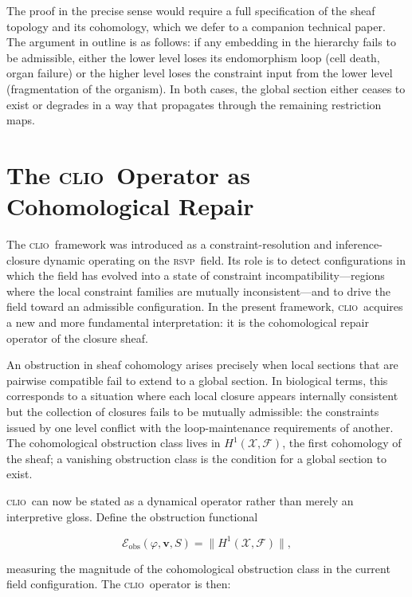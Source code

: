 \documentclass[11pt, a4paper]{article}
\theoremstyle{plain}
\theoremstyle{definition}
\theoremstyle{remark}
\newcommand{\vv}{\mathbf{v}}
\newcommand{\Ent}{S}
\newcommand{\CLIO}{\textsc{clio}}
\newcommand{\RSVP}{\textsc{rsvp}}
\begin{document}
The proof in the precise sense would require a full specification of the sheaf topology and its cohomology, which we defer to a companion technical paper. The argument in outline is as follows: if any embedding in the hierarchy fails to be admissible, either the lower level loses its endomorphism loop (cell death, organ failure) or the higher level loses the constraint input from the lower level (fragmentation of the organism). In both cases, the global section either ceases to exist or degrades in a way that propagates through the remaining restriction maps.

\section{The \CLIO\ Operator as Cohomological Repair}

The \CLIO\ framework was introduced as a constraint-resolution and inference-closure dynamic operating on the \RSVP\ field. Its role is to detect configurations in which the field has evolved into a state of constraint incompatibility---regions where the local constraint families are mutually inconsistent---and to drive the field toward an admissible configuration. In the present framework, \CLIO\ acquires a new and more fundamental interpretation: it is the cohomological repair operator of the closure sheaf.

An obstruction in sheaf cohomology arises precisely when local sections that are pairwise compatible fail to extend to a global section. In biological terms, this corresponds to a situation where each local closure appears internally consistent but the collection of closures fails to be mutually admissible: the constraints issued by one level conflict with the loop-maintenance requirements of another. The cohomological obstruction class lives in $H^1(\mathcal{X}, \mathcal{F})$, the first cohomology of the sheaf; a vanishing obstruction class is the condition for a global section to exist.

\CLIO\ can now be stated as a dynamical operator rather than merely an interpretive gloss. Define the obstruction functional

\[
\mathcal{E}_{\mathrm{obs}}(\varphi, \vv, \Ent) = \bigl\| H^1(\mathcal{X}, \mathcal{F})\bigr\|,
\]

measuring the magnitude of the cohomological obstruction class in the current field configuration. The \CLIO\ operator is then:
\end{document}
